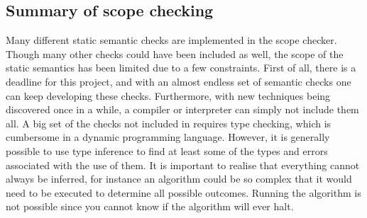 \subsection{Summary of scope checking}
Many different static semantic checks are implemented in the scope checker.
Though many other checks could have been included as well, the scope of the
static semantics has been limited due to a few constraints. First of all, there
is a deadline for this project, and with an almost endless set of semantic
checks one can keep developing these checks. Furthermore, with new techniques
being discovered once in a while, a compiler or interpreter can simply not
include them all. A big set of the checks not included in \productname{}
requires type checking, which is cumbersome in a dynamic programming language.
However, it is generally possible to use type inference to find at least some of
the types and errors associated with the use of them. It is important to realise
that everything cannot always be inferred, for instance an algorithm could be so
complex that it would need to be executed to determine all possible outcomes.
Running the algorithm is not possible since you cannot know if the algorithm
will ever halt.
\cite[p. 173]{itttoc}
